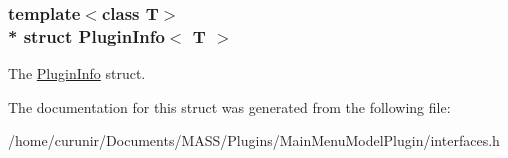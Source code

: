 \subsubsection*{template$<$class T$>$\\*
struct Plugin\+Info$<$ T $>$}

The \hyperlink{struct_plugin_info}{Plugin\+Info} struct. 

The documentation for this struct was generated from the following file\+:\begin{DoxyCompactItemize}
\item 
/home/curunir/\+Documents/\+M\+A\+S\+S/\+Plugins/\+Main\+Menu\+Model\+Plugin/interfaces.\+h\end{DoxyCompactItemize}
